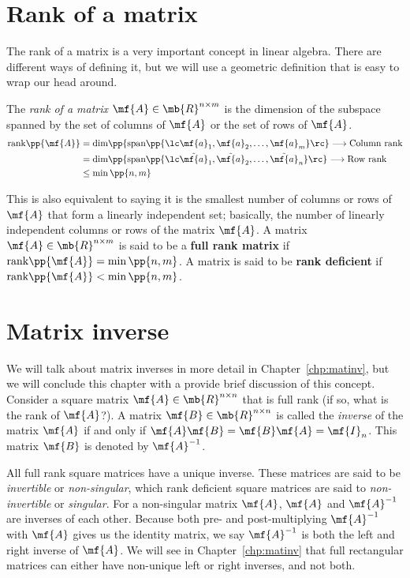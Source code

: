 \section{Rank of a matrix}
The rank of a matrix is a very important concept in linear algebra. There are different ways of defining it, but we will use a geometric definition that is easy to wrap our head around.  

The \textit{rank of a matrix} $\mf{A} \in \mb{R}^{n \times m}$ is the dimension of the subspace spanned by the set of columns of $\mf{A}$ or the set of rows of $\mf{A}$.
\begin{equation}
    \begin{split}
    \text{rank}\pp{\mf{A}} &= \text{dim}\pp{\text{span}\pp{\lc \mf{a}_1, \mf{a}_2, \ldots, \mf {a}_m} \rc} \longrightarrow \text{Column rank}\\ 
    &= \text{dim}\pp{\text{span}\pp{\lc \tilde{\mf{a}}_1, \tilde{\mf{a}}_2, \ldots, \tilde{\mf{a}}_n} \rc} \longrightarrow \text{Row rank} \\
    &\leq \min\pp{n, m}
    \end{split}
    \label{eq:ch02-mat-rank}
\end{equation}

This is also equivalent to saying it is the smallest number of columns or rows of $\mf{A}$ that form  a linearly independent set; basically, the number of linearly independent columns or rows of the matrix $\mf{A}$. A matrix $\mf{A} \in \mb{R}^{n \times m}$ is said to be a \textbf{full rank matrix} if $\text{rank}\pp{\mf{A}} = \min\pp{n, m}$. A matrix is said to be \textbf{rank deficient} if $\text{rank}\pp{\mf{A}} < \min\pp{n, m}$.

\section{Matrix inverse}
We will talk about matrix inverses in more detail in Chapter~\ref{chp:matinv}, but we will conclude this chapter with a provide brief discussion of this concept. Consider a square matrix $\mf{A} \in \mb{R}^{n \times n}$ that is full rank (if so, what is the rank of $\mf{A}$?). A matrix $\mf{B} \in \mb{R}^{n \times n}$ is called the \textit{inverse} of the matrix $\mf{A}$ if and only if $\mf{A}\mf{B} = \mf{B}\mf{A} = \mf{I}_n$. This matrix $\mf{B}$ is denoted by $\mf{A}^{-1}$. 

All full rank square matrices have a unique inverse. These matrices are said to be \textit{invertible} or \textit{non-singular}, which rank deficient square matrices are said to \textit{non-invertible} or \textit{singular}. For a non-singular matrix $\mf{A}$, $\mf{A}$ and $\mf{A}^{-1}$ are inverses of each other. Because both pre- and post-multiplying $\mf{A}^{-1}$ with $\mf{A}$ gives us the identity matrix, we say $\mf{A}^{-1}$ is both the left and right inverse of $\mf{A}$. We will see in Chapter~\ref{chp:matinv} that full rectangular matrices can either have non-unique left or right inverses, and not both.


